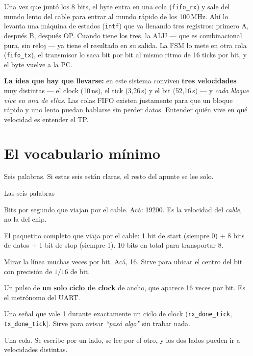 \documentclass[11pt,a4paper]{article}
\newcommand{\sg}[1]{\texttt{\small #1}}
\begin{document}
Una vez que junt\'o los 8 bits, el byte entra en una cola (\sg{fifo\_rx}) y sale
del mundo lento del cable para entrar al mundo r\'apido de los 100\,MHz. Ah\'i lo
levanta una m\'aquina de estados (\sg{intf}) que va llenando tres registros:
primero A, despu\'es B, despu\'es OP. Cuando tiene los tres, la ALU --- que es
combinacional pura, sin reloj --- ya tiene el resultado en su salida. La FSM lo
mete en otra cola (\sg{fifo\_tx}), el transmisor lo saca bit por bit al mismo
ritmo de 16 ticks por bit, y el byte vuelve a la PC.

\begin{clave}
\textbf{La idea que hay que llevarse:} en este sistema conviven
\textbf{tres velocidades} muy distintas --- el clock (10\,ns), el tick
(3{,}26\,\textmu s) y el bit (52{,}16\,\textmu s) --- y \emph{cada bloque vive en
una de ellas}. Las colas FIFO existen justamente para que un bloque r\'apido y
uno lento puedan hablarse sin perder datos. Entender qui\'en vive en qu\'e
velocidad es entender el TP.
\end{clave}

\newpage
\tableofcontents
\newpage

\section{El vocabulario m\'inimo}

Seis palabras. Si estas seis est\'an claras, el resto del apunte se lee solo.

\begin{ficha}{Las seis palabras}
\begin{description}[leftmargin=0pt, labelindent=0pt, labelsep=0.45em,
                    itemsep=5pt, parsep=0pt, topsep=2pt,
                    font=\bfseries\sffamily\color{azul}]
\item[Baud rate.] Bits por segundo que viajan por el cable. Ac\'a: 19200. Es la
  velocidad del \emph{cable}, no la del chip.
\item[Trama (frame).] El paquetito completo que viaja por el cable: 1 bit de
  start (siempre 0) $+$ 8 bits de datos $+$ 1 bit de stop (siempre 1). 10 bits
  en total para transportar 8.
\item[Sobremuestreo.] Mirar la l\'inea muchas veces por bit. Ac\'a, 16. Sirve
  para ubicar el centro del bit con precisi\'on de $1/16$ de bit.
\item[Tick (\texttt{s\_tick}).] Un pulso de \textbf{un solo ciclo de clock} de
  ancho, que aparece 16 veces por bit. Es el metr\'onomo del UART.
\item[Pulso de un ciclo.] Una se\~nal que vale 1 durante exactamente un ciclo de
  clock (\sg{rx\_done\_tick}, \sg{tx\_done\_tick}). Sirve para avisar
  \emph{``pas\'o algo''} sin trabar nada.
\item[FIFO.] Una cola. Se escribe por un lado, se lee por el otro, y los dos
  lados pueden ir a velocidades distintas.
\end{description}
\end{ficha}
\end{document}
